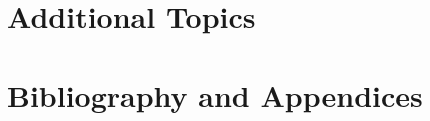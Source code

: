\documentclass[letterpaper, 11pt, twoside, openany]{memoir}
\begin{document}
\part{Additional Topics} 






\part{Bibliography and Appendices} 

\renewcommand\printchaptertitle[1]{%
    \begin{tabular}{@{\Large\bfseries\chaptername}@{ }p{1.0cm}!{\quad}p{\textwidth-4cm-2em-4\tabcolsep }}
      \ifNoChapNumber\relax\else\chapnumfont \thechapter\fi
      & \chaptitlefont 
    \end{tabular}
    \NoChapNumberfalse
}
\renewcommand{\chaptername}{Bibliography}




\appendix
\renewcommand{\chaptername}{Appendix}

\end{document}
